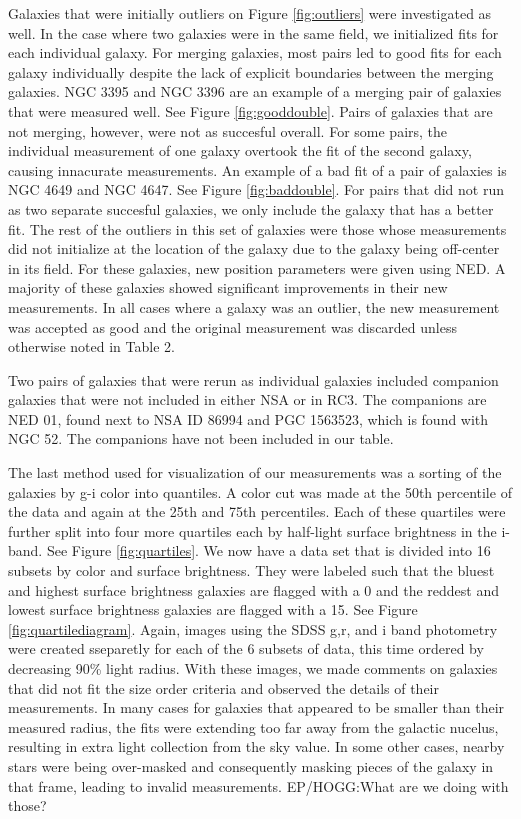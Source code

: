 \documentclass[12pt,preprint,pdftex]{aastex}
\begin{document}
Galaxies that were initially outliers on Figure \ref{fig:outliers}
were investigated as well. In the case where two galaxies were in the
same field, we initialized fits for each individual galaxy. For
merging galaxies, most pairs led to good fits for each galaxy
individually despite the lack of explicit boundaries between the
merging galaxies. NGC 3395 and NGC 3396 are an example of a merging
pair of galaxies that were measured well. See Figure
\ref{fig:gooddouble}. Pairs of galaxies that are not merging, however,
were not as succesful overall. For some pairs, the individual
measurement of one galaxy overtook the fit of the second galaxy,
causing innacurate measurements. An example of a bad fit of a pair of
galaxies is NGC 4649 and NGC 4647. See Figure \ref{fig:baddouble}. For
pairs that did not run as two separate succesful galaxies, we only
include the galaxy that has a better fit. The rest of the outliers in
this set of galaxies were those whose measurements did not initialize
at the location of the galaxy due to the galaxy being off-center in
its field. For these galaxies, new position parameters were given
using NED. A majority of these galaxies showed significant
improvements in their new measurements. In all cases where a galaxy
was an outlier, the new measurement was accepted as good and the
original measurement was discarded unless otherwise noted in Table 2.

Two pairs of galaxies that were rerun as individual galaxies
included companion galaxies that were not included in either
NSA or in RC3. The companions are NED 01, found next to NSA ID
86994 and PGC 1563523, which is found with NGC 52. The companions have
not been included in our table.

The last method used for visualization of our measurements was a
sorting of the galaxies by g-i color into quantiles. A color cut was
made at the 50th percentile of the data and again at the 25th and 75th
percentiles. Each of these quartiles were further split into four more
quartiles each by half-light surface brightness in the i-band. See
Figure \ref{fig:quartiles}. We now have a data set that is divided
into 16 subsets by color and surface brightness. They were labeled
such that the bluest and highest surface brightness galaxies are
flagged with a 0 and the reddest and lowest surface brightness
galaxies are flagged with a 15. See Figure
\ref{fig:quartilediagram}. Again, images using the SDSS g,r, and i
band photometry were created sseparetly for each of the 6 subsets of
data, this time ordered by decreasing 90\% light radius. With these
images, we made comments on galaxies that did not fit the size order
criteria and observed the details of their measurements. In many cases
for galaxies that appeared to be smaller than their measured radius,
the fits were extending too far away from the galactic nucelus,
resulting in extra light collection from the sky value. In some other
cases, nearby stars were being over-masked and consequently masking
pieces of the galaxy in that frame, leading to invalid
measurements. EP/HOGG:What are we doing with those?
\end{document}
